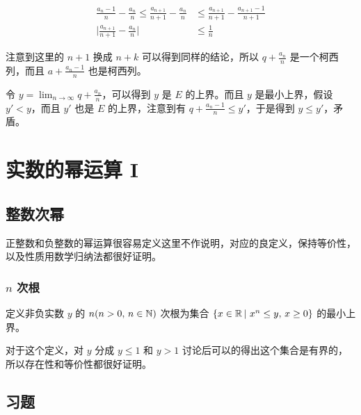 \begin{align*}
\frac{a_{n} - 1}{n} - \frac{a_n}{n} \le \frac{a_{n+1}}{n+1} - \frac{a_n}{n} & \le \frac{a_{n+1}}{n+1} - \frac{a_{n+1} - 1}{n+1} \\
\lvert \frac{a_{n+1}}{n+1} - \frac{a_n}{n} \rvert & \le \frac{1}{n}
\end{align*}

注意到这里的 $n+1$ 换成 $n + k$ 可以得到同样的结论，所以 $q + \frac{a_n}{n}$ 是一个柯西列，而且 $a + \frac{a_n - 1}{n}$ 也是柯西列。

令 $y = \lim_{n \to \infty} q + \frac{a_n}{n}$，可以得到 $y$ 是 $E$ 的上界。而且 $y$ 是最小上界，假设 $y' < y$，而且 $y'$ 也是 $E$ 的上界，注意到有 $q + \frac{a_n-1}{n} \le y'$，于是得到 $y \le y'$，矛盾。

\section{实数的幂运算 I}

\subsection{整数次幂}
正整数和负整数的幂运算很容易定义这里不作说明，对应的良定义，保持等价性，以及性质用数学归纳法都很好证明。

\subsubsection{$n$ 次根}
定义非负实数 $y$ 的 $n (n > 0,\, n \in \mathbb{N})$ 次根为集合 $ \{ x \in \mathbb{R} \,\vert\,  \, x^n \le y,\, x \ge 0 \} $ 的最小上界。

对于这个定义，对 $y$ 分成 $y \le 1$ 和 $y > 1$ 讨论后可以的得出这个集合是有界的，所以存在性和等价性都很好证明。

\subsection{习题}

